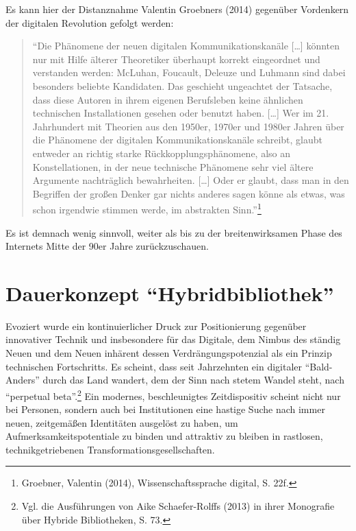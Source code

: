 \documentclass[a4paper,
fontsize=11pt,
oneside,
numbers=noperiodatend,
parskip=half-,
bibliography=totoc,
final
]{scrartcl}
\begin{document}
Es kann hier der Distanznahme Valentin Groebners (2014) gegenüber
Vordenkern der digitalen Revolution gefolgt werden:

\begin{quote}
\enquote{Die Phänomene der neuen digitalen Kommunikationskanäle
{[}\ldots{}{]} könnten nur mit Hilfe älterer Theoretiker überhaupt
korrekt eingeordnet und verstanden werden: McLuhan, Foucault, Deleuze
und Luhmann sind dabei besonders beliebte Kandidaten. Das geschieht
ungeachtet der Tatsache, dass diese Autoren in ihrem eigenen Berufsleben
keine ähnlichen technischen Installationen gesehen oder benutzt haben.
{[}\ldots{}{]} Wer im 21. Jahrhundert mit Theorien aus den 1950er,
1970er und 1980er Jahren über die Phänomene der digitalen
Kommunikationskanäle schreibt, glaubt entweder an richtig starke
Rückkopplungsphänomene, also an Konstellationen, in der neue technische
Phänomene sehr viel ältere Argumente nachträglich bewahrheiten.
{[}\ldots{}{]} Oder er glaubt, dass man in den Begriffen der großen
Denker gar nichts anderes sagen könne als etwas, was schon irgendwie
stimmen werde, im abstrakten Sinn.}\footnote{Groebner, Valentin (2014),
  Wissenschaftssprache digital, S. 22f.}
\end{quote}

Es ist demnach wenig sinnvoll, weiter als bis zu der breitenwirksamen
Phase des Internets Mitte der 90er Jahre zurückzuschauen.

\section*{\texorpdfstring{Dauerkonzept
\enquote{Hybridbibliothek}}{Dauerkonzept Hybridbibliothek}}\label{dauerkonzept-hybridbibliothek}

Evoziert wurde ein kontinuierlicher Druck zur Positionierung gegenüber
innovativer Technik und insbesondere für das Digitale, dem Nimbus des
ständig Neuen und dem Neuen inhärent dessen Verdrängungspotenzial als
ein Prinzip technischen Fortschritts. Es scheint, dass seit Jahrzehnten
ein digitaler \enquote{Bald-Anders} durch das Land wandert, dem der Sinn
nach stetem Wandel steht, nach \enquote{perpetual beta}.\footnote{Vgl.
  die Ausführungen von Aike Schaefer-Rolffs (2013) in ihrer Monografie
  über Hybride Bibliotheken, S. 73.} Ein modernes, beschleunigtes
Zeitdispositiv scheint nicht nur bei Personen, sondern auch bei
Institutionen eine hastige Suche nach immer neuen, zeitgemäßen
Identitäten ausgelöst zu haben, um Aufmerksamkeitspotentiale zu binden
und attraktiv zu bleiben in rastlosen, technikgetriebenen
Transformationsgesellschaften.
\end{document}
